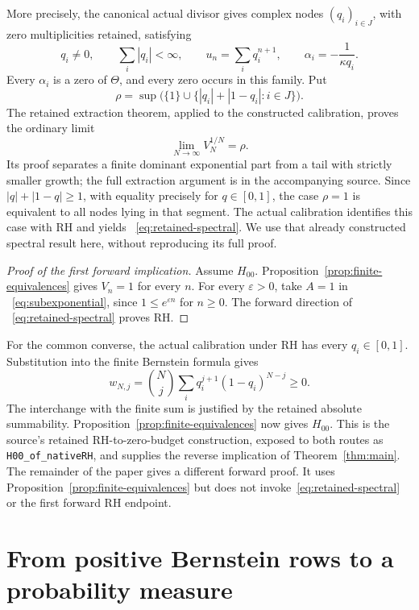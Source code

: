 \documentclass[11pt,a4paper]{article}
\theoremstyle{definition}
\numberwithin{equation}{section}
\newcommand{\RH}{\mathrm{RH}}
\newcommand{\code}[1]{\texttt{\small #1}}
\begin{document}
More precisely, the canonical actual divisor gives complex nodes
$(q_i)_{i\in J}$, with zero multiplicities retained, satisfying
\begin{equation}\label{eq:spectral-calibration}
 q_i\ne0,\qquad \sum_i|q_i|<\infty,\qquad
 u_n=\sum_i q_i^{n+1},\qquad
 \alpha_i=-\frac{1}{\kappa q_i}.
\end{equation}
Every $\alpha_i$ is a zero of $\Theta$, and every zero occurs in this
family. Put
\[
 \rho=\sup\bigl(\{1\}\cup\{|q_i|+|1-q_i|:i\in J\}\bigr).
\]
The retained extraction theorem, applied to the constructed calibration,
proves the ordinary limit
\begin{equation}\label{eq:spectral-limit}
 \lim_{N\to\infty}V_N^{1/N}=\rho.
\end{equation}
Its proof separates a finite dominant exponential part from a tail
with strictly smaller growth; the full extraction argument is in the
accompanying source. Since $|q|+|1-q|\ge1$, with equality precisely for
$q\in[0,1]$, the case $\rho=1$ is equivalent to all nodes lying in that
segment. The actual calibration identifies this case with RH and yields
~\eqref{eq:retained-spectral}. We use that already constructed spectral
result here, without reproducing its full proof.

\begin{proof}[Proof of the first forward implication]
Assume $H_{00}$. Proposition~\ref{prop:finite-equivalences} gives
$V_n=1$ for every $n$. For every $\varepsilon>0$, take $A=1$ in
~\eqref{eq:subexponential}, since
$1\le e^{\varepsilon n}$ for $n\ge0$. The forward direction of
~\eqref{eq:retained-spectral} proves $\RH$.
\end{proof}

For the common converse, the actual calibration under RH has every
$q_i\in[0,1]$. Substitution into the finite Bernstein formula gives
\[
 w_{N,j}=\binom Nj\sum_i q_i^{j+1}(1-q_i)^{N-j}\ge0.
\]
The interchange with the finite sum is justified by the retained
absolute summability. Proposition~\ref{prop:finite-equivalences} now
gives $H_{00}$. This is the source's retained RH-to-zero-budget
construction, exposed to both routes as \code{H00\_of\_nativeRH}, and
supplies the reverse implication of Theorem~\ref{thm:main}. The remainder of the paper gives a
different forward proof. It uses Proposition~\ref{prop:finite-equivalences}
but does not invoke~\eqref{eq:retained-spectral} or the first forward
RH endpoint.

\section{From positive Bernstein rows to a probability measure}\label{sec:measure}
\end{document}
